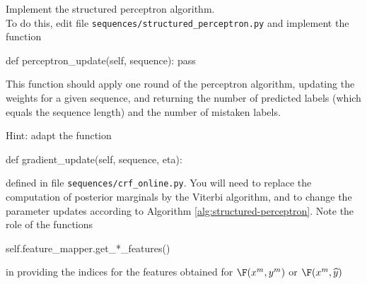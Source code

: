 \begin{exercise}\label{exer:strucperc1}
Implement the structured perceptron algorithm.\\ 
To do this, edit file {\tt sequences/structured\_perceptron.py} 
and implement the function
\begin{python}
def perceptron_update(self, sequence):
    pass
\end{python}
This function should apply one round of the perceptron algorithm,
updating the weights for a given sequence, and returning
the number of predicted labels (which equals the sequence length) 
and the number of mistaken labels. 

Hint: adapt the function 
\begin{python}
def gradient_update(self, sequence, eta):
\end{python}
defined in file {\tt sequences/crf\_online.py}. 
You will need to replace the computation of posterior marginals 
by the Viterbi algorithm, and to change the parameter updates 
according to Algorithm \ref{alg:structured-perceptron}. Note the role of the functions

\begin{python}
self.feature_mapper.get_*_features() 
\end{python}

in providing the indices for the features obtained for $\F(x^m,y^m)$ or $\F(x^m,\widehat{y})$

\end{exercise}


